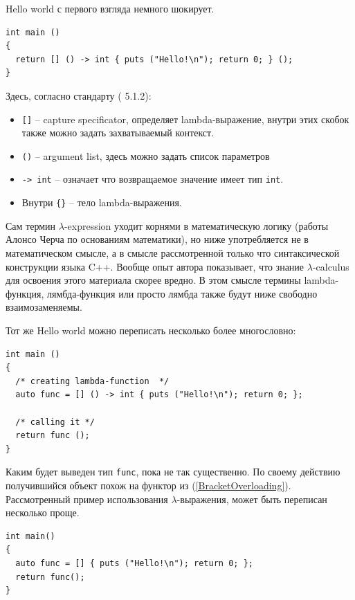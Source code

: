 \documentclass[a4paper,12pt,oneside]{article}
\begin{document}
Hello world с первого взгляда немного шокирует.

\begin{lstlisting}
int main ()
{
  return [] () -> int { puts ("Hello!\n"); return 0; } (); 
}
\end{lstlisting}

Здесь, согласно стандарту (\cite{stdcpp14} 5.1.2): 

\begin{itemize}
\item \lstinline![]! -- capture specificator, определяет lambda-выражение, внутри этих скобок также можно задать захватываемый контекст.

\item \lstinline!()! -- argument list, здесь можно задать список параметров

\item \lstinline!-> int! -- означает что возвращаемое значение имеет тип \lstinline!int!.

\item Внутри \lstinline!{}! -- тело lambda-выражения.
\end{itemize}

Сам термин $\lambda$-expression уходит корнями в математическую логику (работы Алонсо Черча по основаниям математики), но ниже употребляется не в математическом смысле, а в смысле рассмотренной только что синтаксической конструкции языка C++. Вообще опыт автора показывает, что знание $\lambda$-calculus для освоения этого материала скорее вредно. В этом смысле термины lambda-функция, лямбда-функция или просто лямбда также будут ниже свободно взаимозаменяемы.

Тот же Hello world можно переписать несколько более многословно:

\begin{lstlisting}
int main ()
{
  /* creating lambda-function  */
  auto func = [] () -> int { puts ("Hello!\n"); return 0; };

  /* calling it */
  return func (); 
}
\end{lstlisting}


Каким будет выведен тип \lstinline!func!, пока не так существенно. По своему действию получившийся объект похож на функтор из (\ref{BracketOverloading}). Рассмотренный пример использования $\lambda$-выражения, может быть переписан несколько проще.

\begin{lstlisting}
int main()
{
  auto func = [] { puts ("Hello!\n"); return 0; };
  return func(); 
}
\end{lstlisting}
\end{document}
